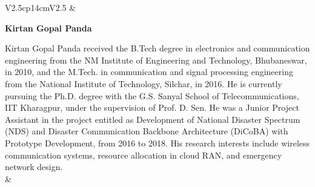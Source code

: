 \begin{tabular}{V{2.5}cp{14cm}V{2.5}}
 & 

\centerline{\large\bf Kirtan Gopal Panda}

\bigskip
Kirtan Gopal Panda received the B.Tech degree in electronics and communication engineering from the NM Institute of Engineering and Technology, Bhubaneswar, in 2010, and the M.Tech. in communication and signal processing engineering from the National Institute of Technology, Silchar,  in 2016. He is currently pursuing the Ph.D. degree with the G.S. Sanyal School of Telecommunications, IIT Kharagpur, under the supervision of Prof. D. Sen. He was a Junior Project Assistant in the project entitled as Development of National Disaster Spectrum (NDS) and Disaster Communication Backbone Architecture (DiCoBA) with Prototype Development, from 2016 to 2018. His research interests include wireless communication systems, resource allocation in cloud RAN, and emergency network design.\\
&\\
\end{tabular}

